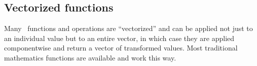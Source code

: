 \subsection{Vectorized functions}

Many \R\ functions and operations are ``vectorized'' and can be applied
not just to an individual value but to an entire vector, in which case
they are applied componentwise and return a vector of transformed values.  
Most traditional mathematics functions are available and work this way.
%
%
%
%
%

\begin{knitrout}
\end{knitrout}
